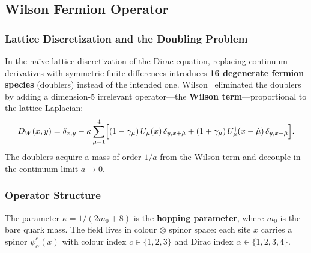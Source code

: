 \documentclass[12pt,a4paper]{article}
\begin{document}
\subsection{Wilson Fermion Operator}
\label{sec:wilson}

\subsubsection{Lattice Discretization and the Doubling Problem}

In the na\"{i}ve lattice discretization of the Dirac equation, replacing
continuum derivatives with symmetric finite differences introduces
\textbf{16 degenerate fermion species} (doublers) instead of the intended one.
Wilson~\cite{Wilson1974} eliminated the doublers by adding a
dimension-5 irrelevant operator---the \textbf{Wilson term}---proportional
to the lattice Laplacian:
\begin{equation}
  D_W(x,y) = \delta_{x,y}
  - \kappa \sum_{\mu=1}^{4}
    \Bigl[
      (1-\gamma_\mu)\,U_\mu(x)\,\delta_{y,x+\hat\mu}
      + (1+\gamma_\mu)\,U_\mu^\dagger(x-\hat\mu)\,\delta_{y,x-\hat\mu}
    \Bigr].
  \label{eq:wilson_op}
\end{equation}
The doublers acquire a mass of order $1/a$ from the Wilson term and
decouple in the continuum limit $a\to 0$.

\subsubsection{Operator Structure}

The parameter $\kappa = 1/(2m_0 + 8)$ is the \textbf{hopping parameter}, where
$m_0$ is the bare quark mass.
The field lives in colour $\otimes$ spinor space: each site $x$ carries a
spinor $\psi_\alpha^c(x)$ with colour index $c\in\{1,2,3\}$ and Dirac index
$\alpha\in\{1,2,3,4\}$.
\end{document}

